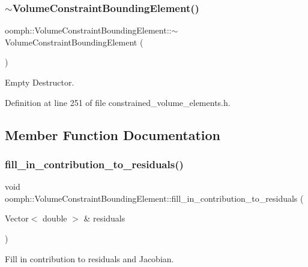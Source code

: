 \subsubsection{\texorpdfstring{$\sim$\+Volume\+Constraint\+Bounding\+Element()}{~VolumeConstraintBoundingElement()}}
{\footnotesize\ttfamily oomph\+::\+Volume\+Constraint\+Bounding\+Element\+::$\sim$\+Volume\+Constraint\+Bounding\+Element (\begin{DoxyParamCaption}{ }\end{DoxyParamCaption})\hspace{0.3cm}{\ttfamily [inline]}}



Empty Destructor. 



Definition at line 251 of file constrained\+\_\+volume\+\_\+elements.\+h.



\subsection{Member Function Documentation}
\mbox{\label{classoomph_1_1VolumeConstraintBoundingElement_a0ae62125450a5d203bc6d26b0d24be22}} 
\subsubsection{\texorpdfstring{fill\+\_\+in\+\_\+contribution\+\_\+to\+\_\+residuals()}{fill\_in\_contribution\_to\_residuals()}}
{\footnotesize\ttfamily void oomph\+::\+Volume\+Constraint\+Bounding\+Element\+::fill\+\_\+in\+\_\+contribution\+\_\+to\+\_\+residuals (\begin{DoxyParamCaption}\item[{Vector$<$ double $>$ \&}]{residuals }\end{DoxyParamCaption})\hspace{0.3cm}{\ttfamily [inline]}}



Fill in contribution to residuals and Jacobian. 



